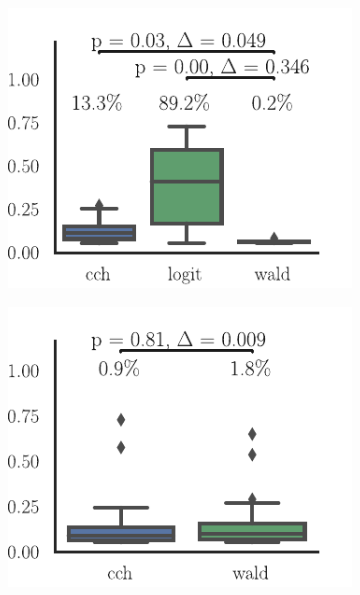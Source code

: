 \documentclass[11pt]{article}
\begin{document}
\begin{figure}
\begin{subfigure}{0.485\textwidth} \includegraphics[scale=1]{false_positive}
\caption{} \label{fig:network-class:1}
\end{subfigure}\hfill
\begin{subfigure}{0.485\textwidth} \includegraphics[scale=1]{false_negative}
\caption{} \label{fig:network-class:2}
\end{subfigure}


\end{figure}
\end{document}
